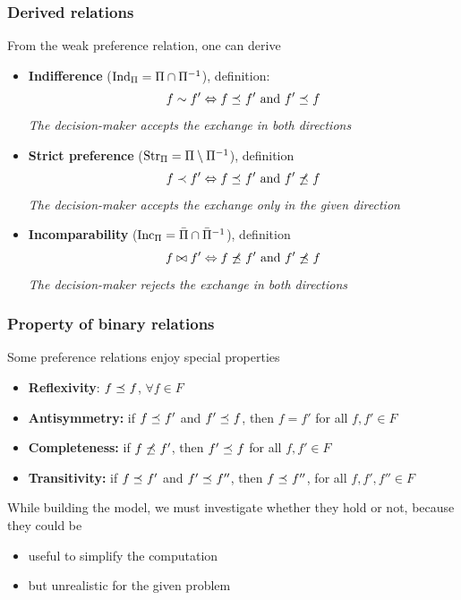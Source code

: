 \subsubsection{Derived relations}
\label{subsubsec:derivedrelations}

From the weak preference relation, one can derive
\begin{itemize}
	\item \textbf{Indifference} ($\text{Ind}_{\Pi} = \Pi \cap \Pi^{-1}$), definition:
	$$ f \sim f' \Leftrightarrow f \preceq_{} f' \text{ and } f' \preceq_{} f $$
	\textit{The decision-maker accepts the exchange in both directions}
	
	\item \textbf{Strict preference} ($\text{Str}_{\Pi} = \Pi \setminus \Pi^{-1}$), definition
	$$ f \prec f' \Leftrightarrow f \preceq_{} f' \text{ and } f' \not \preceq_{} f $$
	\textit{The decision-maker accepts the exchange only in the given direction}
	
	\item \textbf{Incomparability} ($\text{Inc}_{\Pi} = \bar \Pi \cap \bar \Pi^{-1}$), definition
	$$ f \bowtie f' \Leftrightarrow f \not \preceq_{} f' \text{ and } f' \not \preceq_{} f $$
	\textit{The decision-maker rejects the exchange in both directions}
\end{itemize}

\subsubsection{Property of binary relations}

Some preference relations enjoy special properties
\begin{itemize}
	\item \textbf{Reflexivity}: $f \preceq_{} f$, $\forall f \in F$
	
	\item \textbf{Antisymmetry:} if $f \preceq_{} f'$ and $f' \preceq_{} f$, then $f = f'$ for all $f, f' \in F$
	
	\item \textbf{Completeness:} if $f \not \preceq_{} f'$, then $f' \preceq_{} f$ for all $f, f' \in F$
	
	\item \textbf{Transitivity:} if $f \preceq_{} f'$ and $f' \preceq_{} f''$, then $f \preceq_{} f''$, for all $f, f', f'' \in F$
\end{itemize}

While building the model, we must investigate whether they hold or not, because they could be
\begin{itemize}
	\item useful to simplify the computation
	
	\item but unrealistic for the given problem
\end{itemize}

